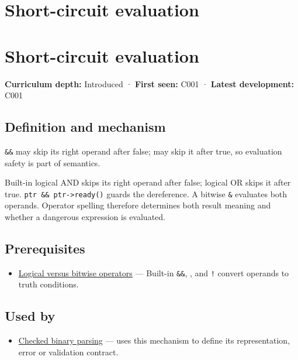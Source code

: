 \hypertarget{appendix-2e245a6fa8d3}{}
\section*{Short-circuit evaluation}
\section{Short-circuit evaluation}\label{short-circuit-evaluation}

\textbf{Curriculum depth:} Introduced · \textbf{First seen:} C001 · \textbf{Latest development:} C001

\subsection{Definition and mechanism}\label{definition-and-mechanism}

\texttt{\&\&} may skip its right operand after false; \texttt{\textbar{}\textbar{}} may skip it after true, so evaluation safety is part of semantics.

Built-in logical AND skips its right operand after false; logical OR skips it after true. \texttt{ptr\ \&\&\ ptr-\textgreater{}ready()} guards the dereference. A bitwise \texttt{\&} evaluates both operands. Operator spelling therefore determines both result meaning and whether a dangerous expression is evaluated.

\subsection{Prerequisites}\label{prerequisites}

\begin{itemize}
\tightlist
\item
  \hyperref[appendix-fe6b457d68d8]{Logical versus bitwise operators} --- Built-in \texttt{\&\&}, \texttt{\textbar{}\textbar{}}, and \texttt{!} convert operands to truth conditions.
\end{itemize}

\subsection{Used by}\label{used-by}

\begin{itemize}
\tightlist
\item
  \hyperref[appendix-652d81568de9]{Checked binary parsing} --- uses this mechanism to define its representation, error or validation contract.
\end{itemize}

